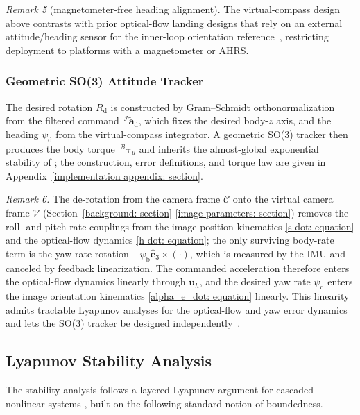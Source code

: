 \documentclass{IEEEtaes}
\begin{document}
\textit{Remark 5} (magnetometer-free heading alignment). The virtual-compass design above contrasts with prior optical-flow landing designs that rely on an external attitude/heading sensor for the inner-loop orientation reference~\cite{herisse2012}, restricting deployment to platforms with a magnetometer or AHRS.

\subsubsection{Geometric SO(3) Attitude Tracker} \label{so3 inner loop: section}
The desired rotation $R_\text{d}$ is constructed by Gram--Schmidt orthonormalization from the filtered command $\,^\mathcal{I}\tilde{\boldsymbol{a}}_\text{d}$, which fixes the desired body-$z$ axis, and the heading $\psi_\text{d}$ from the virtual-compass integrator. A geometric SO(3) tracker then produces the body torque $\,^\mathcal{B}\boldsymbol{\tau}_u$ and inherits the almost-global exponential stability of \cite[Thm.~3.1]{lee2010}; the construction, error definitions, and torque law are given in Appendix~\ref{implementation appendix: section}.

\textit{Remark 6.} The de-rotation from the camera frame $\mathcal{C}$ onto the virtual camera frame $\mathcal{V}$ (Section~\ref{background: section}-\ref{image parameters: section}) removes the roll- and pitch-rate couplings from the image position kinematics \eqref{s dot: equation} and the optical-flow dynamics \eqref{h dot: equation}; the only surviving body-rate term is the yaw-rate rotation $-\dot{\psi}_\text{b}\hat{\boldsymbol{e}}_3\times(\cdot)$, which is measured by the IMU and canceled by feedback linearization. The commanded acceleration therefore enters the optical-flow dynamics linearly through $\boldsymbol{u}_h$, and the desired yaw rate $\dot{\psi}_\text{d}$ enters the image orientation kinematics \eqref{alpha_e_dot: equation} linearly. This linearity admits tractable Lyapunov analyses for the optical-flow and yaw error dynamics and lets the SO(3) tracker be designed independently~\cite{fink2017, xie2016_2}.

\subsection{Lyapunov Stability Analysis} \label{stability: section}
The stability analysis follows a layered Lyapunov argument for cascaded nonlinear systems \cite{khalil2002}, built on the following standard notion of boundedness.
\end{document}
